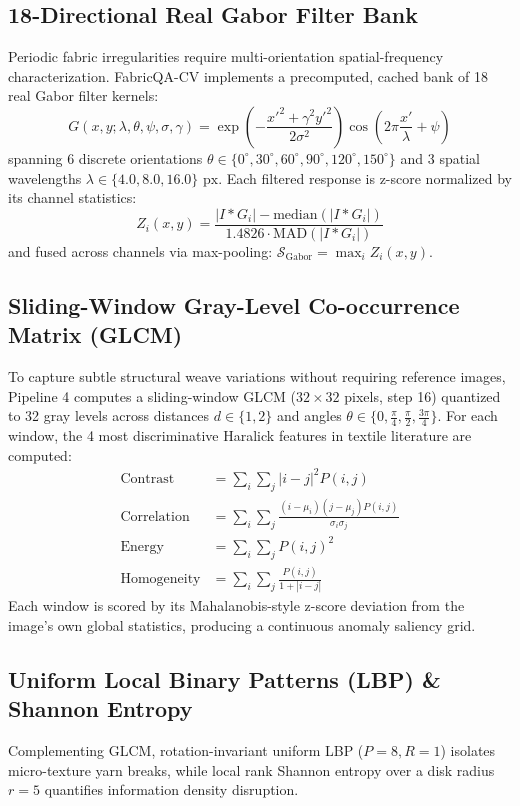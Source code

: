 \documentclass[10pt,a4paper]{article}
\begin{document}
\subsection{18-Directional Real Gabor Filter Bank}
Periodic fabric irregularities require multi-orientation spatial-frequency characterization. FabricQA-CV implements a precomputed, cached bank of 18 real Gabor filter kernels:
\begin{equation}
G(x, y; \lambda, \theta, \psi, \sigma, \gamma) = \exp\left(-\frac{x'^2 + \gamma^2 y'^2}{2\sigma^2}\right) \cos\left(2\pi\frac{x'}{\lambda} + \psi\right)
\end{equation}
spanning 6 discrete orientations $\theta \in \{0^\circ, 30^\circ, 60^\circ, 90^\circ, 120^\circ, 150^\circ\}$ and 3 spatial wavelengths $\lambda \in \{4.0, 8.0, 16.0\}\text{ px}$. Each filtered response is z-score normalized by its channel statistics:
\begin{equation}
Z_i(x, y) = \frac{|I * G_i| - \text{median}(|I * G_i|)}{1.4826 \cdot \text{MAD}(|I * G_i|)}
\end{equation}
and fused across channels via max-pooling: $\mathcal{S}_{\text{Gabor}} = \max_i Z_i(x, y)$.

\subsection{Sliding-Window Gray-Level Co-occurrence Matrix (GLCM)}
To capture subtle structural weave variations without requiring reference images, Pipeline 4 computes a sliding-window GLCM ($32 \times 32$ pixels, step 16) quantized to 32 gray levels across distances $d \in \{1, 2\}$ and angles $\theta \in \{0, \frac{\pi}{4}, \frac{\pi}{2}, \frac{3\pi}{4}\}$. For each window, the 4 most discriminative Haralick features in textile literature are computed:
\begin{align}
\text{Contrast} &= \sum_{i} \sum_{j} |i - j|^2 P(i, j) \\
\text{Correlation} &= \sum_{i} \sum_{j} \frac{(i - \mu_i)(j - \mu_j) P(i, j)}{\sigma_i \sigma_j} \\
\text{Energy} &= \sum_{i} \sum_{j} P(i, j)^2 \\
\text{Homogeneity} &= \sum_{i} \sum_{j} \frac{P(i, j)}{1 + |i - j|}
\end{align}
Each window is scored by its Mahalanobis-style z-score deviation from the image's own global statistics, producing a continuous anomaly saliency grid.

\subsection{Uniform Local Binary Patterns (LBP) \& Shannon Entropy}
Complementing GLCM, rotation-invariant uniform LBP ($P = 8, R = 1$) isolates micro-texture yarn breaks, while local rank Shannon entropy over a disk radius $r = 5$ quantifies information density disruption.
\end{document}
